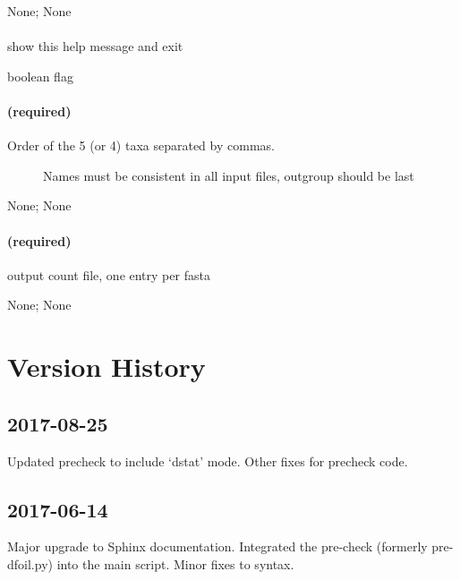 \documentclass[letterpaper,12pt,english]{sphinxmanual}
\begin{document}
 None;  None


\subsubsection{}
\label{\detokenize{prog_desc:id9}}
 show this help message and exit

 boolean flag


\subsubsection{ (required)}
\label{\detokenize{prog_desc:names-n-required}}\begin{description}
\item[{ Order of the 5 (or 4) taxa separated by commas.}] \leavevmode
Names must be  consistent in all input files,
outgroup should be last

\end{description}

 None;  None


\subsubsection{ (required)}
\label{\detokenize{prog_desc:out-o-required}}
 output count file, one entry per fasta

 None;  None


\chapter{Version History}
\label{\detokenize{releases:version-history}}\label{\detokenize{releases::doc}}

\section{2017-08-25}
\label{\detokenize{releases:id1}}
Updated precheck to include ‘dstat’ mode. Other fixes for precheck code.


\section{2017-06-14}
\label{\detokenize{releases:id2}}
Major upgrade to Sphinx documentation. Integrated the pre-check (formerly pre-dfoil.py) into the main script. Minor fixes to syntax.
\end{document}
